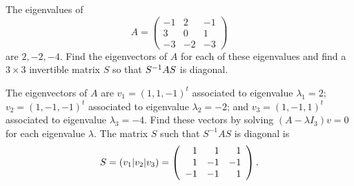 \documentclass{ximera}
\begin{document}
\begin{exercise} \label{c10.3.2}
The eigenvalues of 
\[
A=\left(\begin{array}{rrr} -1 & 2 & -1\\ 3& 0 & 1 \\ -3 & -2 & -3 \end{array}
\right)
\]
are $2,-2,-4$.  Find the eigenvectors of $A$ for each of these eigenvalues and 
find a $3\times 3$ invertible matrix $S$ so that $S^{-1} AS$ is diagonal.

\begin{solution}

\soln
The eigenvectors of $A$ are $v_1 = (1,1,-1)^t$ associated to eigenvalue
$\lambda_1 = 2$; $v_2 = (1,-1,-1)^t$ associated to eigenvalue
$\lambda_2 = -2$; and $v_3 = (1,-1,1)^t$ associated to eigenvalue
$\lambda_3 = -4$.  Find these vectors by solving $(A - \lambda I_3)v = 0$
for each eigenvalue $\lambda$.  The matrix $S$ such that $S^{-1}AS$ is
diagonal is
\[
S = (v_1|v_2|v_3) = \left(\begin{array}{rrr} 1 & 1 & 1 \\ 1 & -1 & -1 \\ -1 & -1 & 1\end{array}\right).
\]

\end{solution}
\end{exercise} 
\end{document}

